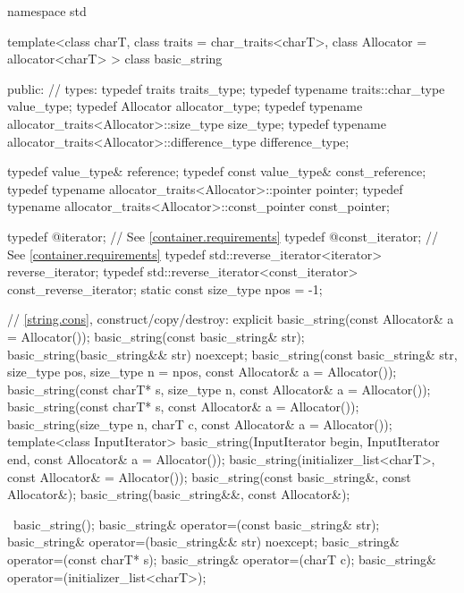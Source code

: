 %
\begin{codeblock}
namespace std {
  template<class charT, class traits = char_traits<charT>,
    class Allocator = allocator<charT> >
  class basic_string {
  public:
    // types:
    typedef          traits                                         traits_type;
    typedef typename traits::char_type                              value_type;
    typedef          Allocator                                      allocator_type;
    typedef typename allocator_traits<Allocator>::size_type         size_type;
    typedef typename allocator_traits<Allocator>::difference_type   difference_type;

    typedef value_type& reference;
    typedef const value_type&   const_reference;
    typedef typename allocator_traits<Allocator>::pointer           pointer;
    typedef typename allocator_traits<Allocator>::const_pointer     const_pointer;

    typedef @\impdef@              iterator;       // See \ref{container.requirements}
    typedef @\impdef@              const_iterator; // See \ref{container.requirements}
    typedef std::reverse_iterator<iterator> reverse_iterator;
    typedef std::reverse_iterator<const_iterator> const_reverse_iterator;
    static const size_type npos = -1;

    // \ref{string.cons}, construct/copy/destroy:
    explicit basic_string(const Allocator& a = Allocator());
    basic_string(const basic_string& str);
    basic_string(basic_string&& str) noexcept;
    basic_string(const basic_string& str, size_type pos, size_type n = npos,
                 const Allocator& a = Allocator());
    basic_string(const charT* s,
                 size_type n, const Allocator& a = Allocator());
    basic_string(const charT* s, const Allocator& a = Allocator());
    basic_string(size_type n, charT c, const Allocator& a = Allocator());
    template<class InputIterator>
      basic_string(InputIterator begin, InputIterator end,
                   const Allocator& a = Allocator());
    basic_string(initializer_list<charT>, const Allocator& = Allocator());
    basic_string(const basic_string&, const Allocator&);
    basic_string(basic_string&&, const Allocator&);

   ~basic_string();
    basic_string& operator=(const basic_string& str);
    basic_string& operator=(basic_string&& str) noexcept;
    basic_string& operator=(const charT* s);
    basic_string& operator=(charT c);
    basic_string& operator=(initializer_list<charT>);

}}
\end{codeblock}
